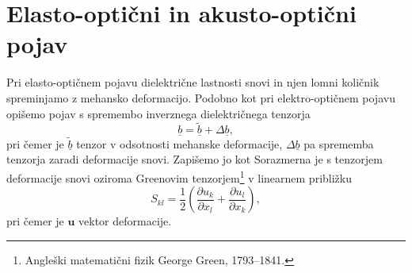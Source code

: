 
\section{Elasto-optični in akusto-optični pojav}
Pri elasto-optičnem pojavu dielektrične lastnosti snovi in njen lomni količnik
spreminjamo z mehansko deformacijo. Podobno kot pri elektro-optičnem pojavu opišemo pojav
s spremembo inverznega dielektričnega tenzorja
\begin{equation}
\underline{b} = \underline{\tilde{b}}+ \Delta\underline{b},
\end{equation}
pri čemer je $\underline{\tilde{b}}$ tenzor v odsotnosti mehanske deformacije, 
$\Delta\underline{b}$ pa sprememba tenzorja zaradi deformacije snovi. Zapišemo jo kot
Sorazmerna je s tenzorjem deformacije snovi oziroma 
Greenovim tenzorjem\footnote{Angleški matematični fizik George Green, 1793--1841.} v
linearnem približku
\begin{equation}
S_{kl}=\frac{1}{2}\left({\frac{\partial u_{k}}{\partial x_{l}}}+{\frac{\partial u_{l}}{\partial x_{k}}}\right),
\label{7.28}
\end{equation}
pri čemer je $\mathbf{u}$ vektor deformacije. 

